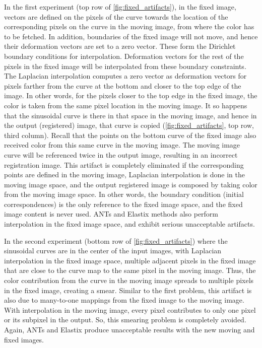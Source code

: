 \documentclass[lettersize,journal]{IEEEtran}
\begin{document}
In the first experiment (top row of \autoref{fig:fixed_artifacts}), in the fixed image, vectors are defined on the pixels of the curve towards the location of the corresponding pixels on the curve in the moving image, from where the color has to be fetched. In addition, boundaries of the fixed image will not move, and hence their deformation vectors are set to a zero vector. These form the Dirichlet boundary conditions for interpolation. Deformation vectors for the rest of the pixels in the fixed image will be interpolated from these boundary constraints. The Laplacian interpolation computes a zero vector as deformation vectors for pixels farther from the curve at the bottom and closer to the top edge of the image. In other words, for the pixels closer to the top edge in the fixed image, the color is taken from the same pixel location in the moving image. It so happens that the sinusoidal curve is there in that space in the moving image, and hence in the output (registered) image, that curve is copied (\autoref{fig:fixed_artifacts}, top row, third column). Recall that the points on the bottom curve of the fixed image also received color from this same curve in the moving image. The moving image curve will be referenced twice in the output image, resulting in an incorrect registration image. This artifact is completely eliminated if the corresponding points are defined in the moving image, Laplacian interpolation is done in the moving image space, and the output registered image is composed by taking color from the moving image space. In other words, the boundary condition (initial correspondences) is the only reference to the fixed image space, and the fixed image content is never used. ANTs and Elastix methods also perform interpolation in the fixed image space, and exhibit serious unacceptable artifacts. 

In the second experiment (bottom row of \autoref{fig:fixed_artifacts}) where the sinusoidal curves are in the center of the input images, with Laplacian interpolation in the fixed image space, multiple adjacent pixels in the fixed image that are close to the curve map to the same pixel in the moving image. Thus, the color contribution from the curve in the moving image spreads to multiple pixels in the fixed image, creating a smear. Similar to the first problem, this artifact is also due to many-to-one mappings from the fixed image to the moving image. With interpolation in the moving image, every pixel contributes to only one pixel or its subpixel in the output. So, this smearing problem is completely avoided. Again, ANTs and Elastix produce unacceptable results with the new moving and fixed images.
 
\end{document}
